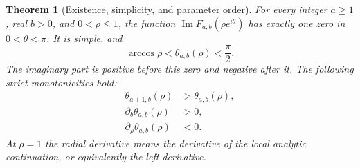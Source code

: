 \documentclass[11pt]{article}
\numberwithin{equation}{section}
\theoremstyle{plain}
\newtheorem{theorem}{Theorem}[section]
\theoremstyle{definition}
\theoremstyle{remark}
\begin{document}
\begin{theorem}[Existence, simplicity, and parameter order]
\label{an:thm:main}
For every integer $a\ge1$, real $b>0$, and $0<\rho\le1$, the
function $\operatorname{Im}F_{a,b}(\rho e^{i\theta})$ has exactly
one zero in $0<\theta<\pi$. It is simple, and
\[
 \arccos\rho<\theta_{a,b}(\rho)<\frac\pi2.
\]
The imaginary part is positive before this zero and negative after it.
The following strict monotonicities hold:
\begin{align}
 \theta_{a+1,b}(\rho)&>\theta_{a,b}(\rho),\label{an:eq:amonotone}\\
 \partial_b\theta_{a,b}(\rho)&>0,\label{an:eq:bmonotone}\\
 \partial_\rho\theta_{a,b}(\rho)&<0.\label{an:eq:rmonotone}
\end{align}
At $\rho=1$ the radial derivative means the derivative of the local
analytic continuation, or equivalently the left derivative.
\end{theorem}
\end{document}
